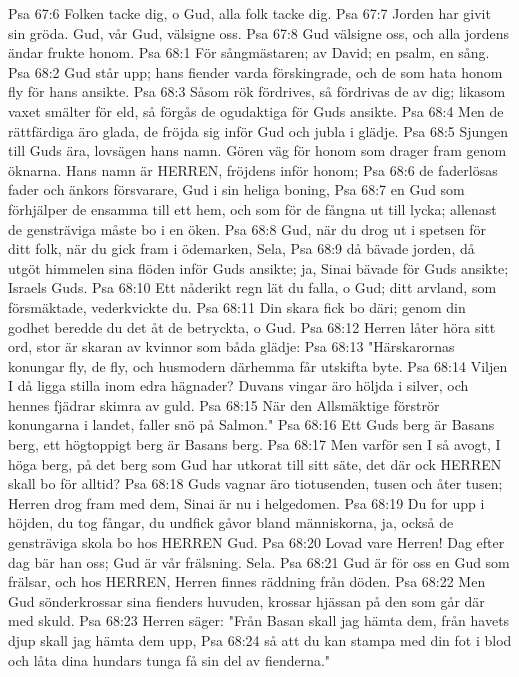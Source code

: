 Psa 67:6  Folken tacke dig, o Gud, alla folk tacke dig.
Psa 67:7  Jorden har givit sin gröda. Gud, vår Gud, välsigne oss.
Psa 67:8  Gud välsigne oss, och alla jordens ändar frukte honom.
Psa 68:1  För sångmästaren; av David; en psalm, en sång.
Psa 68:2  Gud står upp; hans fiender varda förskingrade, och de som hata honom fly för hans ansikte.
Psa 68:3  Såsom rök fördrives, så fördrivas de av dig; likasom vaxet smälter för eld, så förgås de ogudaktiga för Guds ansikte.
Psa 68:4  Men de rättfärdiga äro glada, de fröjda sig inför Gud och jubla i glädje.
Psa 68:5  Sjungen till Guds ära, lovsägen hans namn. Gören väg för honom som drager fram genom öknarna. Hans namn är HERREN, fröjdens inför honom;
Psa 68:6  de faderlösas fader och änkors försvarare, Gud i sin heliga boning,
Psa 68:7  en Gud som förhjälper de ensamma till ett hem, och som för de fångna ut till lycka; allenast de gensträviga måste bo i en öken.
Psa 68:8  Gud, när du drog ut i spetsen för ditt folk, när du gick fram i ödemarken, Sela,
Psa 68:9  då bävade jorden, då utgöt himmelen sina flöden inför Guds ansikte; ja, Sinai bävade för Guds ansikte; Israels Guds.
Psa 68:10  Ett nåderikt regn lät du falla, o Gud; ditt arvland, som försmäktade, vederkvickte du.
Psa 68:11  Din skara fick bo däri; genom din godhet beredde du det åt de betryckta, o Gud.
Psa 68:12  Herren låter höra sitt ord, stor är skaran av kvinnor som båda glädje:
Psa 68:13  "Härskarornas konungar fly, de fly, och husmodern därhemma får utskifta byte.
Psa 68:14  Viljen I då ligga stilla inom edra hägnader? Duvans vingar äro höljda i silver, och hennes fjädrar skimra av guld.
Psa 68:15  När den Allsmäktige förströr konungarna i landet, faller snö på Salmon."
Psa 68:16  Ett Guds berg är Basans berg, ett högtoppigt berg är Basans berg.
Psa 68:17  Men varför sen I så avogt, I höga berg, på det berg som Gud har utkorat till sitt säte, det där ock HERREN skall bo för alltid?
Psa 68:18  Guds vagnar äro tiotusenden, tusen och åter tusen; Herren drog fram med dem, Sinai är nu i helgedomen.
Psa 68:19  Du for upp i höjden, du tog fångar, du undfick gåvor bland människorna, ja, också de gensträviga skola bo hos HERREN Gud.
Psa 68:20  Lovad vare Herren! Dag efter dag bär han oss; Gud är vår frälsning. Sela.
Psa 68:21  Gud är för oss en Gud som frälsar, och hos HERREN, Herren finnes räddning från döden.
Psa 68:22  Men Gud sönderkrossar sina fienders huvuden, krossar hjässan på den som går där med skuld.
Psa 68:23  Herren säger: "Från Basan skall jag hämta dem, från havets djup skall jag hämta dem upp,
Psa 68:24  så att du kan stampa med din fot i blod och låta dina hundars tunga få sin del av fienderna."
